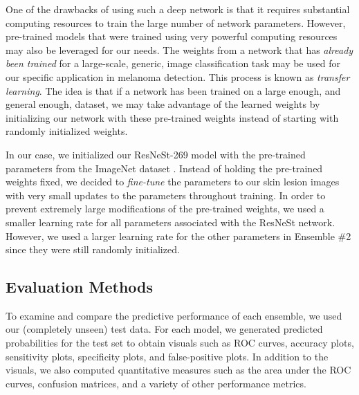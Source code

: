 \documentclass [MAS] {uclathes}
\begin{document}
One of the drawbacks of using such a deep network is that it requires substantial computing resources to train the large number of network parameters. However, pre-trained models that were trained using very powerful computing resources may also be leveraged for our needs. The weights from a network that has \textit{already been trained} for a large-scale, generic, image classification task may be used for our specific application in melanoma detection. This process is known as \textit{transfer learning}. The idea is that if a network has been trained on a large enough, and general enough, dataset, we may take advantage of the learned weights by initializing our network with these pre-trained weights instead of starting with randomly initialized weights. 

In our case, we initialized our ResNeSt-269 model with the pre-trained parameters from the ImageNet dataset \cite{deng2009imagenet}. Instead of holding the pre-trained weights fixed, we decided to \textit{fine-tune} the parameters to our skin lesion images with very small updates to the parameters throughout training. In order to prevent extremely large modifications of the pre-trained weights, we used a smaller learning rate for all parameters associated with the ResNeSt network. However, we used a larger learning rate for the other parameters in Ensemble \#2 since they were still randomly initialized.


\subsection{Evaluation Methods}

To examine and compare the predictive performance of each ensemble, we used our (completely unseen) test data. For each model, we generated predicted probabilities for the test set to obtain visuals such as ROC curves, accuracy plots, sensitivity plots, specificity plots, and false-positive plots. In addition to the visuals, we also computed quantitative measures such as the area under the ROC curves, confusion matrices, and a variety of other performance metrics. 
\end{document}
